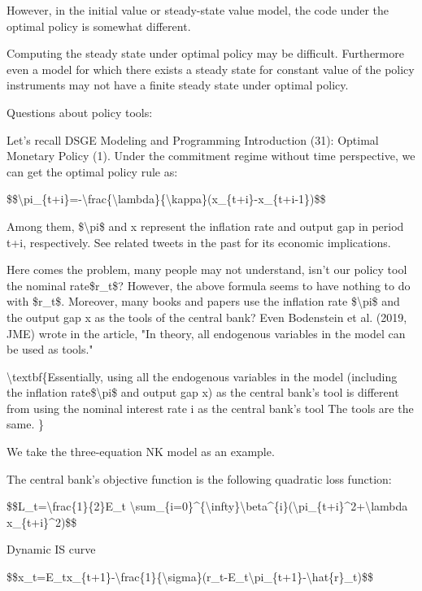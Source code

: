 \documentclass[10pt,math=newtx,citestyle=gb7714-2015,bibstyle=gb7714-2015]{elegantbook}
\begin{document}
	However, in the initial value or steady-state value model, the code under the optimal policy is somewhat different.
	
	Computing the steady state under optimal policy may be difficult. Furthermore even a model for which there exists a steady state for constant value of the policy instruments
	may not have a finite steady state under optimal policy.
	
	Questions about policy tools:
	
	Let's recall DSGE Modeling and Programming Introduction (31): Optimal Monetary Policy (1). Under the commitment regime without time perspective, we can get the optimal policy rule as:
	
	\$\$\textbackslash{}pi\_\{t+i\}=-\textbackslash{}frac\{\textbackslash{}lambda\}\{\textbackslash{}kappa\}(x\_\{t+i\}-x\_\{t+i-1\})\$\$
	
	Among them, \$\textbackslash{}pi\$ and x represent the inflation rate and output gap in period t+i, respectively. See related tweets in the past for its economic implications.
	
	Here comes the problem, many people may not understand, isn't our policy tool the nominal rate\$r\_t\$? However, the above formula seems to have nothing to do with \$r\_t\$. Moreover, many books and papers use the inflation rate \$\textbackslash{}pi\$ and the output gap x as the tools of the central bank? Even Bodenstein et al. (2019, JME) wrote in the article, "In theory, all endogenous variables in the model can be used as tools."
	
	\textbackslash{}textbf\{Essentially, using all the endogenous variables in the model (including the inflation rate\$\textbackslash{}pi\$ and output gap x) as the central bank's tool is different from using the nominal interest rate i as the central bank's tool The tools are the same. \}
	
	We take the three-equation NK model as an example.
	
	The central bank's objective function is the following quadratic loss function:
	
	\$\$L\_t=\textbackslash{}frac\{1\}\{2\}E\_t \textbackslash{}sum\_\{i=0\}\^{}\{\textbackslash{}infty\}\textbackslash{}beta\^{}\{i\}(\textbackslash{}pi\_\{t+i\}\^{}2+\textbackslash{}lambda x\_\{t+i\}\^{}2)\$\$
	
	Dynamic IS curve
	
	\$\$x\_t=E\_tx\_\{t+1\}-\textbackslash{}frac\{1\}\{\textbackslash{}sigma\}(r\_t-E\_t\textbackslash{}pi\_\{t+1\}-\textbackslash{}hat\{r\}\_t)\$\$
	
\end{document}
